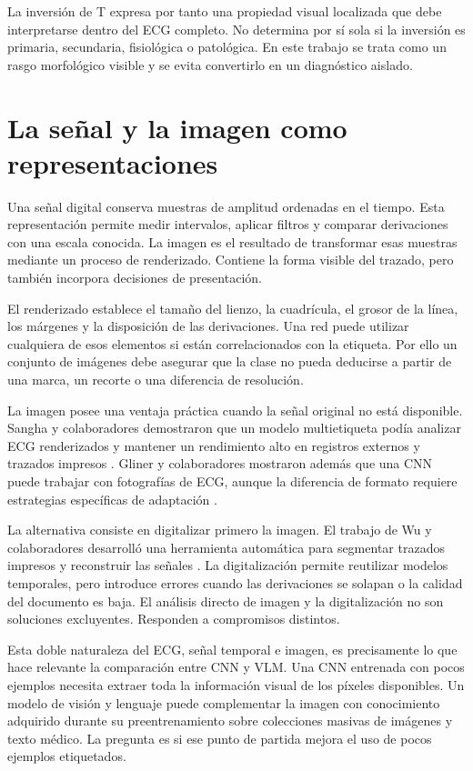 La inversión de T expresa por tanto una propiedad visual localizada que debe interpretarse dentro del ECG completo. No determina por sí sola si la inversión es primaria, secundaria, fisiológica o patológica. En este trabajo se trata como un rasgo morfológico visible y se evita convertirlo en un diagnóstico aislado.

\section{La señal y la imagen como representaciones}

Una señal digital conserva muestras de amplitud ordenadas en el tiempo. Esta representación permite medir intervalos, aplicar filtros y comparar derivaciones con una escala conocida. La imagen es el resultado de transformar esas muestras mediante un proceso de renderizado. Contiene la forma visible del trazado, pero también incorpora decisiones de presentación.

El renderizado establece el tamaño del lienzo, la cuadrícula, el grosor de la línea, los márgenes y la disposición de las derivaciones. Una red puede utilizar cualquiera de esos elementos si están correlacionados con la etiqueta. Por ello un conjunto de imágenes debe asegurar que la clase no pueda deducirse a partir de una marca, un recorte o una diferencia de resolución.

La imagen posee una ventaja práctica cuando la señal original no está disponible. Sangha y colaboradores demostraron que un modelo multietiqueta podía analizar ECG renderizados y mantener un rendimiento alto en registros externos y trazados impresos \cite{sangha2022}. Gliner y colaboradores mostraron además que una CNN puede trabajar con fotografías de ECG, aunque la diferencia de formato requiere estrategias específicas de adaptación \cite{gliner2023}.

La alternativa consiste en digitalizar primero la imagen. El trabajo de Wu y colaboradores desarrolló una herramienta automática para segmentar trazados impresos y reconstruir las señales \cite{wu2022digitization}. La digitalización permite reutilizar modelos temporales, pero introduce errores cuando las derivaciones se solapan o la calidad del documento es baja. El análisis directo de imagen y la digitalización no son soluciones excluyentes. Responden a compromisos distintos.

Esta doble naturaleza del ECG, señal temporal e imagen, es precisamente lo que hace relevante la comparación entre CNN y VLM. Una CNN entrenada con pocos ejemplos necesita extraer toda la información visual de los píxeles disponibles. Un modelo de visión y lenguaje puede complementar la imagen con conocimiento adquirido durante su preentrenamiento sobre colecciones masivas de imágenes y texto médico. La pregunta es si ese punto de partida mejora el uso de pocos ejemplos etiquetados.

